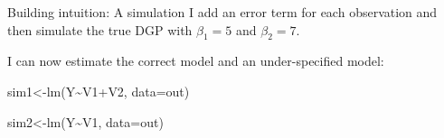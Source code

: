 \documentclass[
  ignorenonframetext,
]{beamer}
\newenvironment{Shaded}{\begin{snugshade}}{\end{snugshade}}
\newcommand{\AttributeTok}[1]{\textcolor[rgb]{0.77,0.63,0.00}{#1}}
\newcommand{\DecValTok}[1]{\textcolor[rgb]{0.00,0.00,0.81}{#1}}
\newcommand{\FunctionTok}[1]{\textcolor[rgb]{0.00,0.00,0.00}{#1}}
\newcommand{\NormalTok}[1]{#1}
\newcommand{\OtherTok}[1]{\textcolor[rgb]{0.56,0.35,0.01}{#1}}
\newcommand{\SpecialCharTok}[1]{\textcolor[rgb]{0.00,0.00,0.00}{#1}}
\begin{document}
\begin{frame}[fragile]{Building intuition: A simulation}
\protect\hypertarget{building-intuition-a-simulation-2}{}
I add an error term for each observation and then simulate the true DGP
with \(\beta_1=5\) and \(\beta_2=7\).

\tiny

\begin{Shaded}
\end{Shaded}

\normalsize

I can now estimate the correct model and an under-specified model:

\tiny

\begin{Shaded}
\begin{Highlighting}[]
\NormalTok{sim1}\OtherTok{\textless{}{-}}\FunctionTok{lm}\NormalTok{(Y}\SpecialCharTok{\textasciitilde{}}\NormalTok{V1}\SpecialCharTok{+}\NormalTok{V2, }\AttributeTok{data=}\NormalTok{out)}

\NormalTok{sim2}\OtherTok{\textless{}{-}}\FunctionTok{lm}\NormalTok{(Y}\SpecialCharTok{\textasciitilde{}}\NormalTok{V1, }\AttributeTok{data=}\NormalTok{out)}
\end{Highlighting}
\end{Shaded}

\normalsize
\end{frame}
\end{document}
